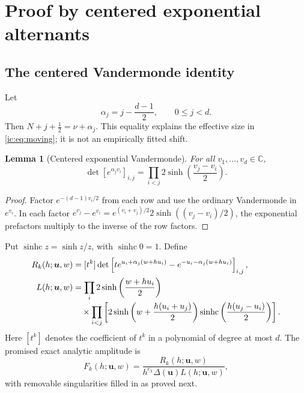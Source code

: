 \documentclass[11pt,a4paper]{article}
\numberwithin{equation}{section}
\newtheorem{lemma}[theorem]{Lemma}
\theoremstyle{definition}
\theoremstyle{remark}
\newcommand{\CC}{\mathbb C}
\newcommand{\Del}{\Delta}
\newcommand{\bu}{\boldsymbol u}
\newcommand{\sinhc}{\operatorname{sinhc}}
\begin{document}
\section{Proof by centered exponential alternants}\label{ic:sec:proof}
\subsection{The centered Vandermonde identity}
Let
\begin{equation}\label{ic:eq:alpha}
 \alpha_j=j-\frac{d-1}{2},\qquad 0\le j<d.
\end{equation}
Then $N+j+\tfrac12=\nu+\alpha_j$. This equality explains the effective
size in \eqref{ic:eq:moving}; it is not an empirically fitted shift.

\begin{lemma}[Centered exponential Vandermonde]\label{ic:lem:center}
For all $v_1,\ldots,v_d\in\CC$,
\begin{equation}\label{ic:eq:center}
 \det[e^{\alpha_jv_i}]_{i,j}
 =\prod_{i<j}2\sinh\left(\frac{v_j-v_i}{2}\right).
\end{equation}
\end{lemma}
\begin{proof}
Factor $e^{-(d-1)v_i/2}$ from each row and use the ordinary Vandermonde
in $e^{v_i}$. In each factor
$e^{v_j}-e^{v_i}=e^{(v_i+v_j)/2}2\sinh((v_j-v_i)/2)$, the exponential
prefactors multiply to the inverse of the row factors.
\end{proof}

Put $\sinhc z=\sinh z/z$, with $\sinhc0=1$. Define
\begin{align}
 R_k(h;\bu,w)
 &=[t^k]\det\left[
 t e^{u_i+\alpha_j(w+hu_i)}
       -e^{-u_i-\alpha_j(w+hu_i)}\right]_{i,j},\label{ic:eq:R}\\
 L(h;\bu,w)
 &=\prod_i2\sinh\left(\frac{w+hu_i}{2}\right)\notag\\[-2pt]
 &\quad\times\prod_{i<j}
 \left[2\sinh\left(w+\frac{h(u_i+u_j)}2\right)
       \sinhc\left(\frac{h(u_j-u_i)}2\right)\right].\label{ic:eq:L}
\end{align}
Here $[t^k]$ denotes the coefficient of $t^k$ in a polynomial of degree at
most $d$. The promised exact analytic amplitude is
\begin{equation}\label{ic:eq:Fexact}
 F_k(h;\bu,w)=
 \frac{R_k(h;\bu,w)}{h^{e_k}\Del(\bu)L(h;\bu,w)},
\end{equation}
with removable singularities filled in as proved next.
\end{document}
